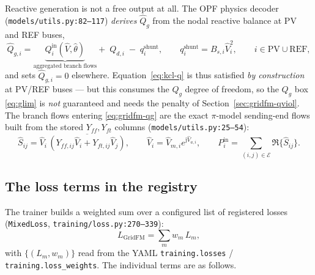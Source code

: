 \documentclass[11pt]{article}
\newcommand{\pred}[1]{\widehat{#1}}
\newcommand{\code}[1]{\texttt{\small #1}}
\begin{document}
Reactive generation is not a free output at all. The OPF physics decoder
(\code{models/utils.py:82--117}) \emph{derives} $\pred{Q}_g$ from the nodal reactive
balance at PV and REF buses,
\begin{equation}
\pred{Q}_{g,i}
=\underbrace{Q_{i}^{\mathrm{in}}(\pred{V},\pred\theta)}_{\text{aggregated branch flows}}
+\;Q_{d,i}\;-\;q^{\mathrm{shunt}}_i,
\qquad
q^{\mathrm{shunt}}_i = B_{s,i}\pred{V}_i^{2},
\qquad i\in \mathrm{PV}\cup\mathrm{REF},
\label{eq:gridfm-qg}
\end{equation}
and sets $\pred{Q}_{g,i}=0$ elsewhere. Equation~\eqref{eq:kcl-q} is thus satisfied
\emph{by construction} at PV/REF buses --- but this consumes the $Q_g$ degree of freedom,
so the $Q_g$ box \eqref{eq:glim} is \emph{not} guaranteed and needs the penalty of
Section~\ref{sec:gridfm-qviol}. The branch flows entering \eqref{eq:gridfm-qg} are the
exact $\pi$-model sending-end flows built from the stored $Y_{ff},Y_{ft}$ columns
(\code{models/utils.py:25--54}):
\begin{equation}
\pred{S}_{ij}=\pred{V}_i\,\overline{\left(Y_{ff,ij}\pred{V}_i+Y_{ft,ij}\pred{V}_j\right)},
\qquad
\pred{V}_i=\pred{V}_{m,i}e^{\mathrm{j}\pred{V}_{a,i}},
\qquad
P^{\mathrm{in}}_i=\!\!\sum_{(i,j)\in\mathcal{E}}\!\!\Re\{\pred{S}_{ij}\}.
\label{eq:gridfm-flows}
\end{equation}

\subsection{The loss terms in the registry}

The trainer builds a weighted sum over a configured list of registered losses
(\code{MixedLoss}, \code{training/loss.py:270--339}):
\begin{equation}
\boxed{\;
L_{\mathrm{GridFM}}=\sum_{m} w_m\, L_m ,
\;}
\label{eq:gridfm-mixed}
\end{equation}
with $\{(L_m,w_m)\}$ read from the YAML \code{training.losses} / \code{training.loss\_weights}.
The individual terms are as follows.
\end{document}

